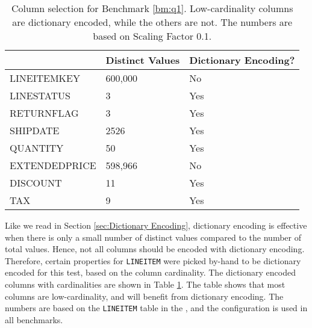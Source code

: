 \begin{table}
    \begin{tabularx}{\textwidth}{X | X X}
        & Distinct Values & Dictionary Encoding? \\ 
        \hline
        \hline
        LINEITEMKEY & 600,000 & No \\
        LINESTATUS & 3 & Yes \\
        RETURNFLAG & 3 & Yes \\
        SHIPDATE & 2526 & Yes \\
        QUANTITY & 50 & Yes \\
        EXTENDEDPRICE & 598,966 & No \\
        DISCOUNT & 11 & Yes \\
        TAX & 9 & Yes
    \end{tabularx}
    \caption{Column selection for Benchmark \ref{bm:q1}. Low-cardinality columns are dictionary encoded, while the others are not. The numbers are based on Scaling Factor 0.1.}
    \label{tab:column-selection}
\end{table}
Like we read in Section \ref{sec:Dictionary Encoding}, dictionary encoding is effective when there is only a small number of distinct values compared to the number of total values. Hence, not all columns should be encoded with dictionary encoding. Therefore, certain properties for \texttt{LINEITEM} were picked by-hand to be dictionary encoded for this test, based on the column cardinality. The dictionary encoded columns with cardinalities are shown in Table \ref{tab:column-selection}. The table shows that most columns are low-cardinality, and will benefit from dictionary encoding. The numbers are based on the \texttt{LINEITEM} table in the \tpch, and the configuration is used in all benchmarks.

